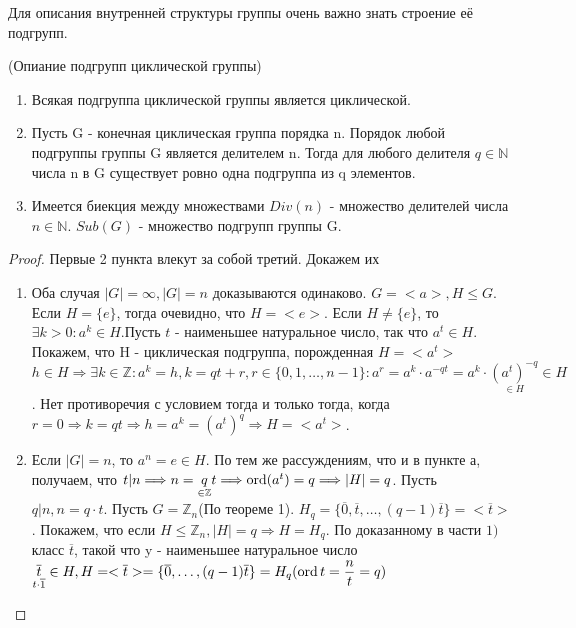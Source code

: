 Для описания внутренней структуры группы очень важно знать строение её подгрупп.
\begin{theorem}
	(Опиание подгрупп циклической группы) \newline
	\begin{enumerate}
		\item Всякая подгруппа циклической группы является циклической.
		\item Пусть G - конечная циклическая группа порядка n. Порядок любой подгруппы группы G является делителем n. Тогда для любого делителя \(q\in\mathbb{N}\) числа n в G существует ровно одна подгруппа из q элементов.
		\item Имеется биекция между множествами \(Div(n)\) - множество делителей числа \(n\in\mathbb{N}\). \(Sub(G)\) - множество подгрупп группы G.
	\end{enumerate}
\end{theorem}
\begin{proof}
	Первые 2 пункта влекут за собой третий. Докажем их
	\begin{enumerate}
		\item Оба случая \(|G| = \infty, |G| = n\) доказываются одинаково. \(G = <a>, H\le G\). Если \(H=\{e\}\), тогда очевидно, что \(H = <e>\). Если \(H\ne \{e\}\), то \(\exists k>0: a^k\in H\).\newline Пусть \(t\) - наименьшее натуральное число, так что \(a^t\in H\). Покажем, что H - циклическая подгруппа, порожденная \(H = <a^t>\)
		\newline
		\( h\in H \Longrightarrow \exists k\in\mathbb{Z}:a^k = h, k = qt+r, r \in\{0, 1, \ldots, n-1\}: a^r = a^k\cdot a^{-qt} = a^k\cdot \underset{\in H}{(a^t)^{-q}}\in H\). \newline
		Нет противоречия с условием тогда и только тогда, когда \(r = 0\Longrightarrow k = qt \Longrightarrow h = a^k = (a^t)^q \Longrightarrow H = <a^t>\). 
		\item Если \(|G| = n\), то \(a^n = e\in H \). По тем же рассуждениям, что и в пункте а, получаем, что \(t|n \Longrightarrow n = \underset{\in\mathbb{Z}}{q}t \Longrightarrow \operatorname{ord}(a^t) = q\Longrightarrow |H| = q\).
		 Пусть \(q|n, n = q\cdot t\). 
		 \newline
		 Пусть \(G = \mathbb{Z}_n\)(По теореме 1). \(H_q = \{\overline 0, \overline t, \ldots, (q-1)\overline t\} = <\overline t>\). 
		 Покажем, что если \(H\le \mathbb{Z}_n, |H| = q \Longrightarrow H = H_q\). По доказанному в части \(1)\) класс \(\overline t\), 
		 такой что y - наименьшее натуральное число \(\underset{t\cdot\overline 1}{\overline t}\in H, H = <\overline t> = \{\overline 0, \ldots, (q-1)\overline t\} = H_q(\operatorname{ord} t =\dfrac{n}{t} = q)\)
	\end{enumerate}
\end{proof}
